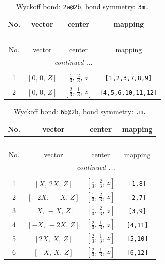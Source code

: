 \documentclass[fleqn,8pt]{jsarticle}
\begin{document}
\begin{longtable}{cccc}
\caption{Wyckoff bond: {\tt 2a@2b}, bond symmetry: {\tt 3m.}}
 \\
 \hline \hline
No. & vector & center & mapping \\ \hline \endfirsthead

\multicolumn{3}{l}{\tablename\ \thetable{}} \\
 \hline \hline
No. & vector & center & mapping \\ \hline \endhead

 \hline \hline
\multicolumn{3}{r}{\footnotesize\it continued ...} \\ \endfoot

 \hline \hline
\multicolumn{3}{r}{} \\ \endlastfoot

1 & $\left[ 0,\, 0,\, Z \right]$ & $\left[ \frac{1}{3},\, \frac{2}{3},\, z \right]$ & {\tt [1,2,3,7,8,9]} \\ \hline
2 & $\left[ 0,\, 0,\, Z \right]$ & $\left[ \frac{2}{3},\, \frac{1}{3},\, z \right]$ & {\tt [4,5,6,10,11,12]} \\
\end{longtable}
\renewcommand{\arraystretch}{1.2}
\begin{longtable}{cccc}
\caption{Wyckoff bond: {\tt 6b@2b}, bond symmetry: {\tt .m.}}
 \\
 \hline \hline
No. & vector & center & mapping \\ \hline \endfirsthead

\multicolumn{3}{l}{\tablename\ \thetable{}} \\
 \hline \hline
No. & vector & center & mapping \\ \hline \endhead

 \hline \hline
\multicolumn{3}{r}{\footnotesize\it continued ...} \\ \endfoot

 \hline \hline
\multicolumn{3}{r}{} \\ \endlastfoot

1 & $\left[ X,\, 2 X,\, Z \right]$ & $\left[ \frac{1}{3},\, \frac{2}{3},\, z \right]$ & {\tt [1,8]} \\ \hline
2 & $\left[ - 2 X,\, - X,\, Z \right]$ & $\left[ \frac{1}{3},\, \frac{2}{3},\, z \right]$ & {\tt [2,7]} \\ \hline
3 & $\left[ X,\, - X,\, Z \right]$ & $\left[ \frac{1}{3},\, \frac{2}{3},\, z \right]$ & {\tt [3,9]} \\ \hline
4 & $\left[ - X,\, - 2 X,\, Z \right]$ & $\left[ \frac{2}{3},\, \frac{1}{3},\, z \right]$ & {\tt [4,11]} \\ \hline
5 & $\left[ 2 X,\, X,\, Z \right]$ & $\left[ \frac{2}{3},\, \frac{1}{3},\, z \right]$ & {\tt [5,10]} \\ \hline
6 & $\left[ - X,\, X,\, Z \right]$ & $\left[ \frac{2}{3},\, \frac{1}{3},\, z \right]$ & {\tt [6,12]} \\
\end{longtable}
\end{document}
